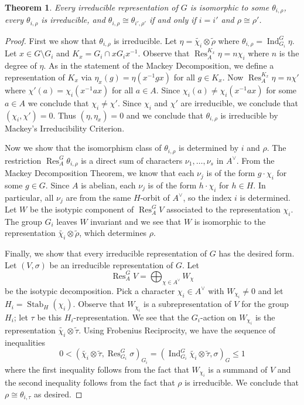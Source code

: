 \documentclass[12pt]{article}
\theoremstyle{plain}
\newtheorem{theorem}{Theorem}[section]
\theoremstyle{definition}
\theoremstyle{remark}
\numberwithin{equation}{section}
\begin{document}
\begin{theorem}
Every irreducible representation of $G$ is isomorphic to some
$\theta_{i,\rho}$,
every $\theta_{i,\rho}$ is irreducible, and
$\theta_{i,\rho} \cong \theta_{i', \rho'}$ if and only if 
$i=i'$ and $\rho \cong \rho'$.
\end{theorem}

\begin{proof}
First we show that $\theta_{i,\rho}$ is irreducible.
Let $\eta = \widetilde{\chi_i} \otimes \widetilde{\rho}$
where $\theta_{i,\rho} = \operatorname{Ind}_{G_i}^G \eta$.
Let $x \in G \setminus G_i$ and $K_x = G_i \cap xG_ix^{-1}$.
Observe that $\operatorname{Res}^{K_x}_A \eta = n\chi_i$
where $n$ is the degree of $\eta$.
As in the statement of the Mackey Decomposition,
we define a representation of $K_x$ via
$\eta_x (g) = \eta(x^{-1}gx)$ for all $g \in K_x$.
Now $\operatorname{Res}^{K_x}_A \eta = n\chi'$
where $\chi'(a) = \chi_i(x^{-1}ax)$ for all $a \in A$.
Since $\chi_i(a) \ne \chi_i(x^{-1}ax)$ for some $a \in A$
we conclude that $\chi_i \ne \chi'$.
Since $\chi_i$ and $\chi'$ are irreducible, we conclude that
$(\chi_i, \chi')=0$.  Thus $(\eta,\eta_x)=0$ and we
conclude that $\theta_{i,\rho}$ is irreducible by Mackey's
Irreducibility Criterion.

Now we show that the isomorphism class of $\theta_{i,\rho}$
is determined by $i$ and $\rho$.
The restriction $\operatorname{Res}^G_A \theta_{i,\rho}$
is a direct sum of characters $\nu_1,\ldots,\nu_s$ in $A^\vee$.
From the Mackey Decomposition Theorem, we know that each
$\nu_j$ is of the form $g \cdot \chi_i$ for some $g \in G$.
Since $A$ is abelian, each $\nu_j$ is of the form $h \cdot \chi_i$
for $h \in H$.  In particular, all $\nu_j$ are from the same $H$-orbit
of $A^\vee$, so the index $i$ is determined.
Let $W$ be the isotypic component of $\operatorname{Res}^G_A V$
associated to the representation $\chi_i$.
The group $G_i$ leaves $W$ invariant and we see that 
$W$ is isomorphic to the representation
$\widetilde{\chi_i} \otimes \widetilde{\rho}$,
which determines $\rho$.

Finally, we show that every irreducible representation of $G$ has the
desired form.  Let $(V, \sigma)$ be an irreducible representation of $G$.
Let
\[
\operatorname{Res}^G_A V = \bigoplus_{\chi \in A^\vee} W_\chi
\]
be the isotypic decomposition.  Pick a character $\chi_i \in A^\vee$
with $W_{\chi_i} \ne 0$ and let $H_i = \operatorname{Stab}_H(\chi_i)$.
Observe that $W_{\chi_i}$ is a subrepresentation of $V$
for the group $H_i$; let $\tau$ be this $H_i$-representation.
We see that the $G_i$-action on $W_{\chi_i}$ is the representation
$\widetilde{\chi_i} \otimes \widetilde{\tau}$.
Using Frobenius Reciprocity, we have the sequence of inequalities
\[
0 < \left( \widetilde{\chi_i} \otimes \widetilde{\tau},
\operatorname{Res}^G_{G_i} \sigma \right)_{G_i}
= \left( \operatorname{Ind}^G_{G_i} \widetilde{\chi_i} \otimes \widetilde{\tau},
\sigma \right)_{G} \le 1
\]
where the first inequality follows from the fact that
$W_{\chi_i}$ is a summand of $V$ and the second inequality
follows from the fact that $\rho$ is irreducible.
We conclude that $\rho \cong \theta_{i,\tau}$ as desired.
\end{proof}
\end{document}
